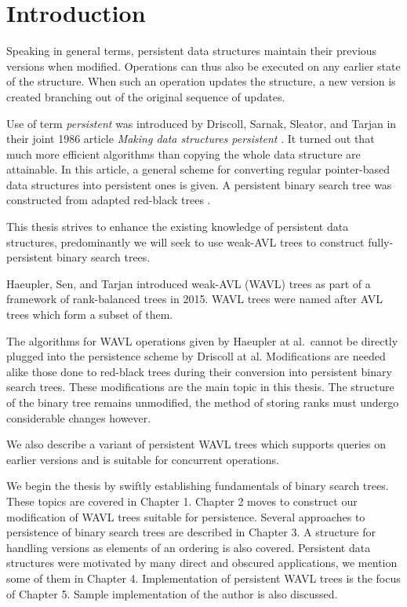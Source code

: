 \chapter*{Introduction}

Speaking in general terms, persistent data structures maintain their previous versions when modified. Operations can thus also be executed on any earlier state of the structure. When such an operation updates the structure, a new version is created branching out of the original sequence of updates.

Use of term \emph{persistent} was introduced by Driscoll, Sarnak, Sleator, and Tarjan in their joint 1986 article \emph{Making data structures persistent} \cite{persistence-DSST}. It turned out that much more efficient algorithms than copying the whole data structure are attainable. In this article, a general scheme for converting regular pointer-based data structures into persistent ones is given. A persistent binary search tree was constructed from adapted red-black trees \cite{red-black-trees}.

This thesis strives to enhance the existing knowledge of persistent data structures, predominantly we will seek to use weak-AVL trees to construct fully-persistent binary search trees.

Haeupler, Sen, and Tarjan \cite{weight-balanced} introduced weak-AVL (WAVL) trees as part of a framework of rank-balanced trees in 2015. WAVL trees were named after AVL trees which form a subset of them.

The algorithms for WAVL operations given by Haeupler at al.~cannot be directly plugged into the persistence scheme by Driscoll at al. Modifications are needed alike those done to red-black trees during their conversion into persistent binary search trees. These modifications are the main topic in this thesis. The structure of the binary tree remains unmodified, the method of storing ranks must undergo considerable changes however.

We also describe a variant of persistent WAVL trees which supports queries on earlier versions and is suitable for concurrent operations.

We begin the thesis by swiftly establishing fundamentals of binary search trees. These topics are covered in Chapter 1. 
Chapter 2 moves to construct our modification of WAVL trees suitable for persistence. 
Several approaches to persistence of binary search trees are described in Chapter 3. A structure for handling versions as elements of an ordering is also covered. 
Persistent data structures were motivated by many direct and obscured applications, we mention some of them in Chapter 4. 
Implementation of persistent WAVL trees is the focus of Chapter 5. Sample implementation of the author is also discussed.